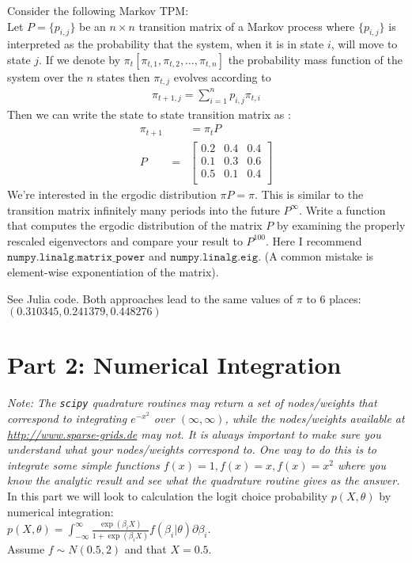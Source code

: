 \documentclass{article}
\begin{document}
\begin{tcolorbox}
Consider the following Markov TPM:\\
Let $P = \{p_{i,j} \}$ be an $n \times n$ transition matrix of a Markov process where $\{p_{i,j} \}$ is interpreted as the probability that the system, when it is in state $i$, will move to state $j$. If we denote by $\pi_t [ \pi_{t,1} , \pi_{t,2}, \ldots, \pi_{t,n}]$ the probability mass function of the system over the $n$ states then $\pi_{t,j}$ evolves according to 
\begin{eqnarray*}
\pi_{t+1,j} = \sum_{i=1}^n p_{i,j} \pi_{t,i}
\end{eqnarray*}
Then we can write the state to state transition matrix as :
\begin{eqnarray*}
\pi_{t+1}& &= \pi_t P \\
P &=&
\left[ {\begin{array}{ccc}
    0.2&    0.4&    0.4\\
    0.1&    0.3&    0.6\\
    0.5&    0.1&    0.4\\
 \end{array} } \right]
\end{eqnarray*}
We're interested in the ergodic distribution $\pi P = \pi$. This is similar to the transition matrix infinitely many periods into the future $P^{\infty}$. Write a function that computes the ergodic distribution of the matrix $P$ by examining the properly rescaled eigenvectors and compare your result to $P^{100}$. Here I recommend $\mathtt{numpy.linalg.matrix\_power}$ and $\mathtt{numpy.linalg.eig}$. (A common mistake is element-wise exponentiation of the matrix).
\end{tcolorbox}

See Julia code. Both approaches lead to the same values of $\pi$ to 6 places:
$(0.310345, 0.241379, 0.448276)$

\section*{Part 2: Numerical Integration}

\begin{tcolorbox}
\textit{Note: The \texttt{scipy} quadrature routines may return a set of nodes/weights that correspond to integrating $e^{-x^2}$ over $(\infty,\infty)$, while the nodes/weights available at \url{http://www.sparse-grids.de} may not. It is always important to make sure you understand what your nodes/weights correspond to. One way to do this is to integrate some simple functions $f(x)=1,f(x)=x,f(x)=x^2$ where you know the analytic result and see what the quadrature routine gives as the answer.}\\

In this part we will look to calculation the logit choice probability $p(X,\theta)$ by numerical integration:\\
 $p(X,\theta) =\int_{-\infty}^{\infty} \frac{\exp(\beta_i X)}{1+ \exp(\beta_i X)} f(\beta_i | \theta) \partial \beta_i$. \\
 Assume $f \sim N(0.5,2)$ and that $X = 0.5$.
\end{tcolorbox}
\end{document}
